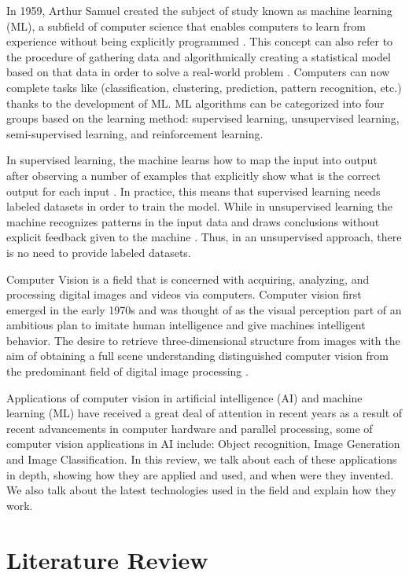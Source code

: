 \documentclass[12pt,twocolumn,a4paper]{article}
\begin{document}
    In 1959, Arthur Samuel created the subject of study known as machine learning (ML), a subfield of computer science that enables computers to learn from experience without being explicitly programmed \cite{Samuel1959-rx}. This concept can also refer to the procedure of gathering data and algorithmically creating a statistical model based on that data in order to solve a real-world problem \cite{Burkov2019-rd}. Computers can now complete tasks like (classification, clustering, prediction, pattern recognition, etc.) thanks to the development of ML. ML algorithms can be categorized into four groups based on the learning method: supervised learning, unsupervised learning, semi-supervised learning, and reinforcement learning.
    
    In supervised learning, the machine learns how to map the input into output after observing a number of examples that explicitly show what is the correct output for each input \cite{Russell2020-tt}. In practice, this means that supervised learning needs labeled datasets in order to train the model. While in unsupervised learning the machine recognizes patterns in the input data and draws conclusions without explicit feedback given to the machine \cite{Russell2020-tt}. Thus, in an unsupervised approach, there is no need to provide labeled datasets. 
    
    Computer Vision is a field that is concerned with acquiring, analyzing, and processing digital images and videos via computers. Computer vision first emerged in the early 1970s and was thought of as the visual perception part of an ambitious plan to imitate human intelligence and give machines intelligent behavior. The desire to retrieve three-dimensional structure from images with the aim of obtaining a full scene understanding distinguished computer vision from the predominant field of digital image processing \cite{Szeliski2011}.

    Applications of computer vision in artificial intelligence (AI) and machine learning (ML) have received a great deal of attention in recent years as a result of recent advancements in computer hardware and parallel processing, some of computer vision applications in AI include: Object recognition, Image Generation and Image Classification. In this review, we talk about each of these applications in depth, showing how they are applied and used, and when were they invented. We also talk about the latest technologies used in the field and explain how they work.
    
    \section{Literature Review}
\end{document}
